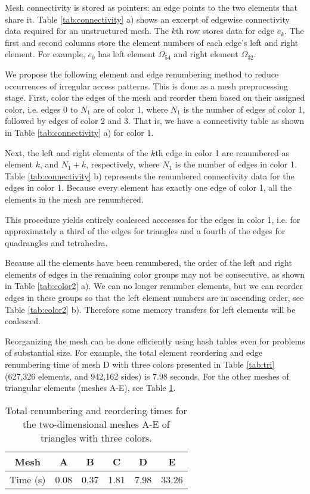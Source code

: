 \documentclass[12pt]{article}
\begin{document}
	

	Mesh connectivity is stored as pointers: an edge points to the two elements that share it.  Table \ref{tab:connectivity} a) shows an excerpt of edgewise connectivity data required for an unstructured mesh.  The $k$th row stores data for edge $e_k$.  The first and second columns store the element numbers of each edge's left and right element.  For example, $e_0$ has left element $\Omega_{54}$ and right element $\Omega_{32}$.
	
	We propose the following element and edge renumbering method to reduce occurrences of irregular access patterns.  This is done as a mesh preprocessing stage.  First, color the edges of the mesh and reorder them based on their assigned color, i.e. edges 0 to $N_1$ are of color 1, where $N_1$ is the number of edges of color 1, followed by edges of color 2 and 3.  That is, we have a connectivity table as shown in Table \ref{tab:connectivity} a) for color 1.
	
	Next, the left and right elements of the $k$th edge in color 1 are renumbered as element $k$, and $N_1+k$, respectively, where $N_1$ is the number of edges in color 1.  Table \ref{tab:connectivity} b) represents the renumbered connectivity data for the edges in color 1.  Because every element has exactly one edge of color 1, all the elements in the mesh are renumbered.
	
	This procedure yields entirely coalesced acccesses for the edges in color 1, i.e. for approximately a third of the edges for triangles and a fourth of the edges for quadrangles and tetrahedra. 
	
	Because all the elements have been renumbered, the order of the left and right elements of edges in the remaining color groups may not be consecutive, as shown in Table \ref{tab:color2} a).  We can no longer renumber elements, but we can reorder edges in these groups so that the left element numbers are in ascending order, see Table \ref{tab:color2} b).  Therefore some memory transfers for left elements will be coalesced.  
	
	Reorganizing the mesh can be done efficiently using hash tables even for problems of substantial size.  For example, the total element reordering and edge renumbering time of mesh D with three colors presented in Table \ref{tab:tri} (627,326 elements, and 942,162 sides) is 7.98 seconds.  For the other meshes of triangular elements (meshes A-E), see Table \ref{tab:renum}.
	
	\begin{table}
	\centering

	\begin{tabular}{|c|c|c|c|c|c|}
			\hline Mesh & A & B & C & D & E \\ 
			\hline Time (s) & 0.08 & 0.37 & 1.81 & 7.98 & 33.26 \\ 
			\hline
	\end{tabular} 
	\caption{Total renumbering and reordering times for the two-dimensional meshes A-E of triangles with three colors.} \label{tab:renum}
	\end{table}
	
\end{document}
